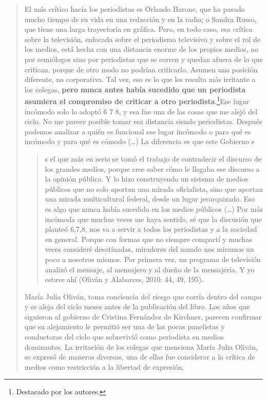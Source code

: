 {\begin{quote}
El más crítico hacia los periodistas es Orlando Barone, que ha pasado mucho tiempo de su vida en una redacción y en la radio; o Sandra Russo, que tiene una larga trayectoria en gráfica. Pero, en todo caso, esa crítica sobre la televisión, enfocada sobre el periodismo televisivo y sobre el rol de los medios, está hecha con una distancia enorme de los propios medios, no por semiólogos sino por periodistas que se corren y quedan afuera de lo que critican, porque de otro modo no podrían criticarlo. Asumen una posición diferente, no corporativa. Tal vez, eso es lo que les resulta más irritante a los colegas, \textbf{pero nunca antes había sucedido que un periodista asumiera el compromiso de criticar a otro periodista}.\footnote{Destacado por los autores.}Ese lugar incómodo solo lo adoptó 6 7 8, y esa fue una de las cosas que me alejó del ciclo. No me parece posible tomar esa distancia siendo periodistas. Después podemos analizar a quién es funcional ese lugar incómodo o para qué es incómodo y para qué es cómodo (\ldots) La diferencia es que este Gobierno e\begin{quote}s el que más en serio se tomó el trabajo de contradecir el discurso de los grandes medios, porque cree saber cómo le llegaba ese discurso a la opinión pública. Y lo hizo construyendo un sistema de medios públicos que no solo aportan una mirada oficialista, sino que aportan una mirada multicultural federal, desde un lugar jerarquizado. Eso es algo que nunca había sucedido en los medios públicos (\ldots) Por más incómoda que muchas veces me haya sentido, sé que la discusión que planteó 6,7,8, nos va a servir a todos los periodistas y a la sociedad en general. Porque con formas que no siempre compartí y muchas veces consideré desatinadas, miradores del mundo nos miramos un poco a nosotros mismos. Por primera vez, un programa de televisión analizó el mensaje, al mensajero y al dueño de la mensajería. Y yo estuve ahí (Oliván y Alabarces, 2010: 44, 49, 195).
\end{quote}

María Julia Oliván, toma conciencia del riesgo que corría dentro del campo y se aleja del ciclo meses antes de la publicación del libro. Los años que siguieron al gobierno de Cristina Fernández de Kirchner, parecen confirmar que su alejamiento le permitió ser una de las pocas panelistas y conductoras del ciclo que sobrevivió como periodista en medios dominantes. La irritación de los colegas que menciona María Julia Oliván, se expresó de maneras diversas, una de ellas fue considerar a la crítica de medios como restricción a la libertad de expresión.


\end{quote}}
